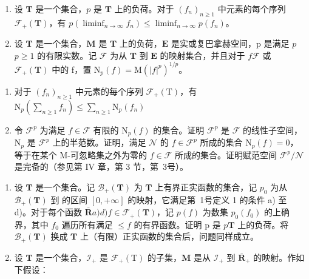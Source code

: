 \begin{enumerate}
\def\labelenumi{\arabic{enumi})}
\setcounter{enumi}{2}
\item
  设 \(\mathbf{T}\) 是一个集合，\(p\) 是 \(\mathbf{T}\) 上的负荷。对于 \((f_n)_{n\geqslant 1}\) 中元素的每个序列 \(\mathcal{F}_{+}(\mathbf{T})\)，有 \(p(\liminf_{n\to \infty}f_n)\leqslant \liminf_{n\to \infty}p(f_n)\)。
\item
  设 \(\mathbf{T}\) 是一个集合，\(\mathbf{M}\) 是 \(\mathbf{T}\) 上的负荷，\(\mathbf{E}\) 是实或复巴拿赫空间，p 是满足 \(p\)\(p \geqslant 1\) 的有限实数。记 \(\mathcal{F}\) 为从 \(\mathbf{T}\) 到 \(\mathbf{E}\) 的映射集合，并且对于 \(f\)\(\mathcal{F}\) 或 \(\mathcal{F}_{+}(\mathbf{T})\) 中的 f，置 \(\mathrm{N}_p(f) = \mathrm{M}(|f|^p)^{1/p}\)。
\end{enumerate}

\begin{enumerate}
\def\labelenumi{\alph{enumi})}
\item
  对于 \((f_n)_{n\geqslant 1}\) 中元素的每个序列 \(\mathcal{F}_{+}(\mathrm{T})\)，有 \(\mathrm{N}_p\left(\sum_{n\geqslant 1}f_n\right)\leqslant \sum_{n\geqslant 1}\mathrm{N}_p(f_n)\)
\item
  令 \(\mathcal{F}^p\) 为满足 \(f \in \mathcal{F}\) 有限的 \(\mathrm{N}_p(f)\) 的集合。证明 \(\mathcal{F}^p\) 是 \(\mathcal{F}\) 的线性子空间，\(\mathrm{N}_p\) 是 \(\mathcal{F}^p\) 上的半范数。证明，满足 \(\mathcal{N}\) 的 \(f \in \mathcal{F}^p\) 所成的集合 \(\mathrm{N}_p(f) = 0\)，等于在某个 M-可忽略集之外为零的 \(f \in \mathcal{F}\) 所成的集合。证明赋范空间 \(\mathcal{F}^p / \mathcal{N}\) 是完备的（参见第 IV 章，第 3 节，第~3号）。
\end{enumerate}

\begin{enumerate}
\def\labelenumi{\arabic{enumi})}
\setcounter{enumi}{4}
\item
  设 \(\mathbf{T}\) 是一个集合。记 \(\mathcal{B}_{+}(\mathbf{T})\) 为 \(\mathbf{T}\) 上有界正实函数的集合，记 \(p_0\) 为从 \(\mathcal{B}_{+}(\mathbf{T})\) 到  的区间 \([0, +\infty]\) 的映射，它满足第~1号定义 1 的条件 a) 至 d)。对于每个函数 \(\overline{\mathbf{R}}\)\(a)\)\(d)\)\(f \in \mathcal{F}_{+}(\mathbf{T})\)，记 \(p(f)\) 为数集 \(p_0(f_0)\) 的上确界，其中 \(f_0\) 遍历所有满足 \(\leqslant f\) 的有界函数。证明 p 是 \(p\)\(\mathbf{T}\) 上的负荷。将 \(\mathcal{B}_{+}(\mathbf{T})\) 换成 \(\mathbf{T}\) 上（有限）正实函数的集合后，问题同样成立。
\item
  设 \(\mathbf{T}\) 是一个集合，\(\mathcal{I}_{+}\) 是 \(\mathcal{F}_{+}(\mathrm{T})\) 的子集，\(\mathbf{M}\) 是从 \(\mathcal{I}_{+}\) 到 \(\overline{\mathbf{R}}_{+}\) 的映射。作如下假设：
\end{enumerate}

